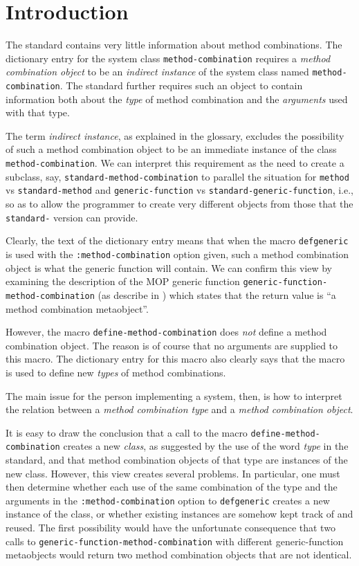 \section{Introduction}
\label{sec-introduction}

The \commonlisp{} standard \cite{ansi:common:lisp} contains very
little information about method combinations.  The dictionary entry
for the system class \texttt{method-combination} requires a
\emph{method combination object} to be an \emph{indirect instance} of
the system class named \texttt{method-combination}.  The standard
further requires such an object to contain information both about the
\emph{type} of method combination and the \emph{arguments} used with
that type.

The term \emph{indirect instance}, as explained in the glossary,
excludes the possibility of such a method combination object to be an
immediate instance of the class \texttt{method-combination}.  We can
interpret this requirement as the need to create a subclass, say,
\texttt{standard-method-combination} to parallel the situation for
\texttt{method} vs \texttt{standard-method} and
\texttt{generic-function} vs \texttt{standard-generic-function}, i.e.,
so as to allow the programmer to create very different objects from
those that the \texttt{standard-} version can provide.

Clearly, the text of the dictionary entry means that when the macro
\texttt{defgeneric} is used with the \texttt{:method-combination}
option given, such a method combination object is what the generic
function will contain.  We can confirm this view by examining the
description of the MOP generic function
\texttt{generic-function-method-combination} (as describe in
\cite{Kiczales:1991:AMP:574212}) which states that the return value is
``a method combination metaobject''.

However, the macro \texttt{define-method-combination} does \emph{not}
define a method combination object.  The reason is of course that no
arguments are supplied to this macro.  The dictionary entry for this
macro also clearly says that the macro is used to define new
\emph{types} of method combinations.

The main issue for the person implementing a \commonlisp{} system,
then, is how to interpret the relation between a \emph{method
  combination type} and a \emph{method combination object}.

It is easy to draw the conclusion that a call to the macro
\texttt{define-method-combination} creates a new \emph{class}, as
suggested by the use of the word \emph{type} in the standard, and that
method combination objects of that type are instances of the new
class.  However, this view creates several problems.  In particular,
one must then determine whether each use of the same combination of
the type and the arguments in the \texttt{:method-combination} option
to \texttt{defgeneric} creates a new instance of the class, or whether
existing instances are somehow kept track of and reused.  The first
possibility would have the unfortunate consequence that two calls to
\texttt{generic-function-method-combination} with different
generic-function metaobjects would return two method combination
objects that are not identical.

